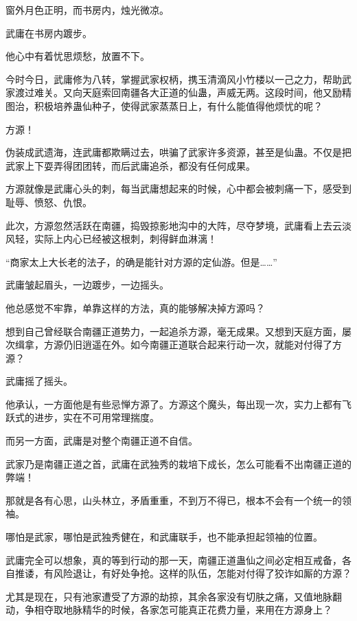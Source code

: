 
\begin{this_body}



窗外月色正明，而书房内，烛光微凉。

武庸在书房内踱步。

他心中有着忧思烦愁，放置不下。

今时今日，武庸修为八转，掌握武家权柄，携玉清滴风小竹楼以一己之力，帮助武家渡过难关。又向天庭索回南疆各大正道的仙蛊，声威无两。这段时间，他又励精图治，积极培养蛊仙种子，使得武家蒸蒸日上，有什么能值得他烦忧的呢？

方源！

伪装成武遗海，连武庸都欺瞒过去，哄骗了武家许多资源，甚至是仙蛊。不仅是把武家上下耍弄得团团转，而后武庸追杀，都没有任何成果。

方源就像是武庸心头的刺，每当武庸想起来的时候，心中都会被刺痛一下，感受到耻辱、愤怒、仇恨。

此次，方源忽然活跃在南疆，捣毁掠影地沟中的大阵，尽夺梦境，武庸看上去云淡风轻，实际上内心已经被这根刺，刺得鲜血淋漓！

“商家太上大长老的法子，的确是能针对方源的定仙游。但是……”

武庸皱起眉头，一边踱步，一边摇头。

他总感觉不牢靠，单靠这样的方法，真的能够解决掉方源吗？

想到自己曾经联合南疆正道势力，一起追杀方源，毫无成果。又想到天庭方面，屡次缉拿，方源仍旧逍遥在外。如今南疆正道联合起来行动一次，就能对付得了方源？

武庸摇了摇头。

他承认，一方面他是有些忌惮方源了。方源这个魔头，每出现一次，实力上都有飞跃式的进步，实在不可用常理揣度。

而另一方面，武庸是对整个南疆正道不自信。

武家乃是南疆正道之首，武庸在武独秀的栽培下成长，怎么可能看不出南疆正道的弊端！

那就是各有心思，山头林立，矛盾重重，不到万不得已，根本不会有一个统一的领袖。

哪怕是武家，哪怕是武独秀健在，和武庸联手，也不能承担起领袖的位置。

武庸完全可以想象，真的等到行动的那一天，南疆正道蛊仙之间必定相互戒备，各自推诿，有风险退让，有好处争抢。这样的队伍，怎能对付得了狡诈如厮的方源？

尤其是现在，只有池家遭受了方源的劫掠，其余各家没有切肤之痛，又值地脉翻动，争相夺取地脉精华的时候，各家怎可能真正花费力量，来用在方源身上？


\end{this_body}
